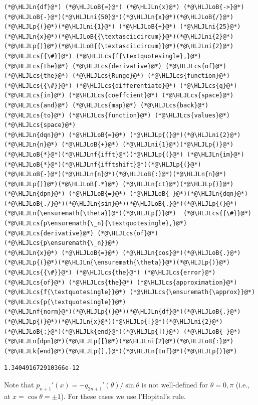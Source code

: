 \documentclass[12pt,a4paper]{article}
\newcommand{\HLJLk}[1]{\textcolor[RGB]{148,91,176}{\textbf{#1}}}
\newcommand{\HLJLn}[1]{#1}
\newcommand{\HLJLnf}[1]{\textcolor[RGB]{66,102,213}{#1}}
\newcommand{\HLJLni}[1]{\textcolor[RGB]{59,151,46}{#1}}
\newcommand{\HLJLoB}[1]{\textcolor[RGB]{102,102,102}{\textbf{#1}}}
\newcommand{\HLJLp}[1]{#1}
\newcommand{\HLJLcs}[1]{\textcolor[RGB]{153,153,119}{\textit{#1}}}
\begin{document}
\begin{lstlisting}
(*@\HLJLn{df}@*) (*@\HLJLoB{=}@*) (*@\HLJLn{x}@*) (*@\HLJLoB{->}@*) (*@\HLJLoB{-}@*)(*@\HLJLni{50}@*)(*@\HLJLn{x}@*)(*@\HLJLoB{/}@*)(*@\HLJLp{(}@*)(*@\HLJLni{1}@*) (*@\HLJLoB{+}@*) (*@\HLJLni{25}@*)(*@\HLJLn{x}@*)(*@\HLJLoB{{\textasciicircum}}@*)(*@\HLJLni{2}@*)(*@\HLJLp{)}@*)(*@\HLJLoB{{\textasciicircum}}@*)(*@\HLJLni{2}@*) (*@\HLJLcs{{\#}}@*) (*@\HLJLcs{f{\textquotesingle},}@*) (*@\HLJLcs{the}@*) (*@\HLJLcs{derivative}@*) (*@\HLJLcs{of}@*) (*@\HLJLcs{the}@*) (*@\HLJLcs{Runge}@*) (*@\HLJLcs{function}@*)
(*@\HLJLcs{{\#}}@*) (*@\HLJLcs{differentiate}@*) (*@\HLJLcs{q}@*) (*@\HLJLcs{in}@*) (*@\HLJLcs{coeffcient}@*) (*@\HLJLcs{space}@*) (*@\HLJLcs{and}@*) (*@\HLJLcs{map}@*) (*@\HLJLcs{back}@*) (*@\HLJLcs{to}@*) (*@\HLJLcs{function}@*) (*@\HLJLcs{values}@*) (*@\HLJLcs{space}@*)
(*@\HLJLn{dqn}@*) (*@\HLJLoB{=}@*) (*@\HLJLp{(}@*)(*@\HLJLni{2}@*)(*@\HLJLn{n}@*) (*@\HLJLoB{+}@*) (*@\HLJLni{1}@*)(*@\HLJLp{)}@*)(*@\HLJLoB{*}@*)(*@\HLJLnf{ifft}@*)(*@\HLJLp{(}@*) (*@\HLJLn{im}@*)(*@\HLJLoB{*}@*)(*@\HLJLnf{ifftshift}@*)(*@\HLJLp{(}@*)(*@\HLJLoB{-}@*)(*@\HLJLn{n}@*)(*@\HLJLoB{:}@*)(*@\HLJLn{n}@*)(*@\HLJLp{)}@*)(*@\HLJLoB{.*}@*) (*@\HLJLn{ct}@*)(*@\HLJLp{)}@*) 
(*@\HLJLn{dpn}@*) (*@\HLJLoB{=}@*) (*@\HLJLoB{-}@*)(*@\HLJLn{dqn}@*) (*@\HLJLoB{./}@*)(*@\HLJLn{sin}@*)(*@\HLJLoB{.}@*)(*@\HLJLp{(}@*)(*@\HLJLn{\ensuremath{\theta}}@*)(*@\HLJLp{)}@*)  (*@\HLJLcs{{\#}}@*) (*@\HLJLcs{p\ensuremath{\_n}{\textquotesingle},}@*) (*@\HLJLcs{derivative}@*) (*@\HLJLcs{of}@*) (*@\HLJLcs{p\ensuremath{\_n}}@*)
(*@\HLJLn{x}@*) (*@\HLJLoB{=}@*) (*@\HLJLn{cos}@*)(*@\HLJLoB{.}@*)(*@\HLJLp{(}@*)(*@\HLJLn{\ensuremath{\theta}}@*)(*@\HLJLp{)}@*)
(*@\HLJLcs{{\#}}@*) (*@\HLJLcs{the}@*) (*@\HLJLcs{error}@*) (*@\HLJLcs{of}@*) (*@\HLJLcs{the}@*) (*@\HLJLcs{approximation}@*) (*@\HLJLcs{f{\textquotesingle}}@*) (*@\HLJLcs{\ensuremath{\approx}}@*) (*@\HLJLcs{p{\textquotesingle}}@*)
(*@\HLJLnf{norm}@*)(*@\HLJLp{(}@*)(*@\HLJLn{df}@*)(*@\HLJLoB{.}@*)(*@\HLJLp{(}@*)(*@\HLJLn{x}@*)(*@\HLJLp{[}@*)(*@\HLJLni{2}@*)(*@\HLJLoB{:}@*)(*@\HLJLk{end}@*)(*@\HLJLp{])}@*) (*@\HLJLoB{-}@*) (*@\HLJLn{dpn}@*)(*@\HLJLp{[}@*)(*@\HLJLni{2}@*)(*@\HLJLoB{:}@*)(*@\HLJLk{end}@*)(*@\HLJLp{],}@*)(*@\HLJLn{Inf}@*)(*@\HLJLp{)}@*)
\end{lstlisting}

\begin{lstlisting}
1.340491672910366e-12
\end{lstlisting}


Note that $p_{n+1}'(x) = -q_{2n+1}'(\theta)/\sin \theta$ is not well-defined for $\theta = 0, \pi$ (i.e., at $x = \cos\theta =  \pm 1$).  For these cases we use l'Hopital's rule.
\end{document}
